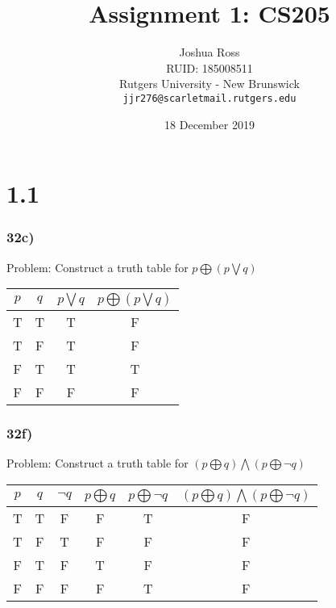 \documentclass{article}
\begin{document}
\title{Assignment 1: CS205}

\author{Joshua Ross\\
	RUID: 185008511\\
	Rutgers University - New Brunswick\\
	\texttt{jjr276@scarletmail.rutgers.edu}}

\date{18 December 2019}

\maketitle

\section*{1.1}
\subsubsection*{32c)}
Problem: Construct a truth table for $p \bigoplus (p \bigvee q)$
\begin{center}
\begin{tabular}{|c|c|c|c|}
\hline
$p$ & $q$ & $p \bigvee q$ & $p \bigoplus (p \bigvee q)$ \\
\hline
T & T & T & F \\
T & F & T & F \\
F & T & T & T \\
F & F & F & F \\
\hline
\end{tabular}
\end{center}
\subsubsection*{32f)}
Problem: Construct a truth table for $(p \bigoplus q) \bigwedge (p \bigoplus \neg q)$
\begin{center}
\begin{tabular}{|c|c|c|c|c|c|}
\hline
$p$ & $q$ & $\neg q$ & $p \bigoplus q$ & $p \bigoplus \neg q$ & $(p \bigoplus q) \bigwedge (p \bigoplus \neg q)$ \\
\hline
T & T & F & F & T & F\\
T & F & T & F & F & F\\
F & T & F & T & F & F\\
F & F & F & F & T & F\\
\hline
\end{tabular}
\end{center}
\end{document}
